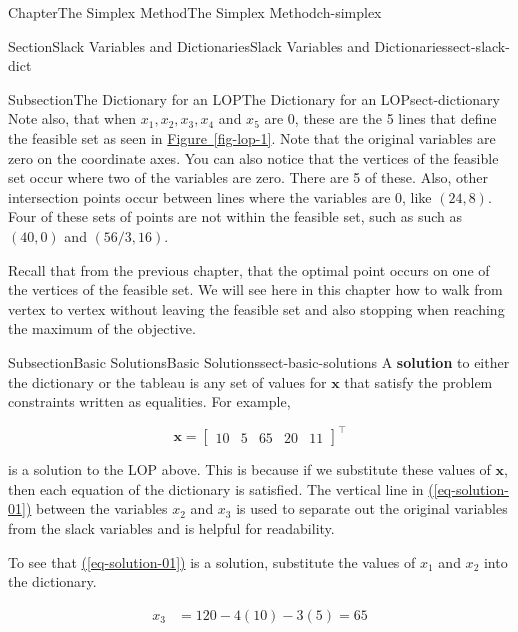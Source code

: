 \documentclass[oneside,10pt,]{book}
\newcommand{\xreffont}{\relax}
\newcommand{\terminology}[1]{\textbf{#1}}
\numberwithin{equation}{section}
\newcommand{\amp}{&}
\begin{document}
\begin{chapterptx}{Chapter}{The Simplex Method}{}{The Simplex Method}{}{}{ch-simplex}
\begin{sectionptx}{Section}{Slack Variables and Dictionaries}{}{Slack Variables and Dictionaries}{}{}{sect-slack-dict}
\begin{subsectionptx}{Subsection}{The Dictionary for an LOP}{}{The Dictionary for an LOP}{}{}{sect-dictionary}
Note also, that when \(x_1, x_2, x_3, x_4\) and \(x_5\) are 0, these are the 5 lines that define the feasible set as seen in \hyperref[fig-lop-1]{Figure~{\xreffont\ref{fig-lop-1}}}. Note that the original variables are zero on the coordinate axes. You can also notice that the vertices of the feasible set occur where two of the variables are zero. There are 5 of these. Also, other intersection points occur between lines where the variables are 0, like \((24,8)\). Four of these sets of points are not within the feasible set, such as such as \((40,0)\) and \((56/3,16)\).%
\par
Recall that from the previous chapter, that the optimal point occurs on one of the vertices of the feasible set. We will see here in this chapter how to walk from vertex to vertex without leaving the feasible set and also stopping when reaching the maximum of the objective.%
\end{subsectionptx}
%
%
\typeout{************************************************}
\typeout{************************************************}
%
\begin{subsectionptx}{Subsection}{Basic Solutions}{}{Basic Solutions}{}{}{sect-basic-solutions}
A \terminology{solution} to either the dictionary or the tableau is any set of values for \(\boldsymbol{x}\) that satisfy the problem constraints written as equalities. For example,%
\par
%
\begin{equation}
\boldsymbol{x}=\left[\begin{array}{rr|rrr}10 \amp 5 \amp 65 \amp 20 \amp 11\end{array}\right]^{\intercal}\label{eq-solution-01}
\end{equation}
%
\par
is a solution to the LOP above. This is because if we substitute these values of \(\boldsymbol{x}\), then each equation of the dictionary is satisfied. The vertical line in \hyperref[eq-solution-01]{({\xreffont\ref{eq-solution-01}})} between the variables \(x_2\) and \(x_3\) is used to separate out the original variables from the slack variables and is helpful for readability.%
\par
To see that \hyperref[eq-solution-01]{({\xreffont\ref{eq-solution-01}})} is a solution, substitute the values of \(x_1\) and \(x_2\) into the dictionary.%
\par
%
\begin{align*}
x_3 \amp = 120 - 4(10) - 3(5) = 65 \\

\end{align*}
\end{subsectionptx}
\end{sectionptx}
\end{chapterptx}
\end{document}
